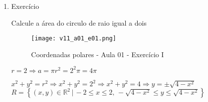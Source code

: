 \begin{enumerate}
	\item Exercício
	
	Calcule a área do circulo de raio igual a dois
	
	\begin{figure}[H]
		\caption{Coordenadas polares - Aula 01 - Exercício I}
		\label{v11_a01_e01}
		\centering
		\texttt{[image: v11\_a01\_e01.png]}		
	\end{figure}
	
	$r = 2 \Rightarrow a = \pi r^2 = 2^2 \pi = 4\pi$\newline
	
	$x^2 + y^2 = r^2 \Rightarrow x^2 + y^2 = 2^2 \Rightarrow x^2 + y^2 = 4 \Rightarrow y = \pm\sqrt{4 - x^2}$\newline	
	$R = \left\{(x, y) \in \mathbb{R}^2 \,|\, -2 \leq x \leq 2,\, -\sqrt{4 - x^2} \leq y \leq \sqrt{4 - x^2} \right\}$\newline
	

\end{enumerate}
